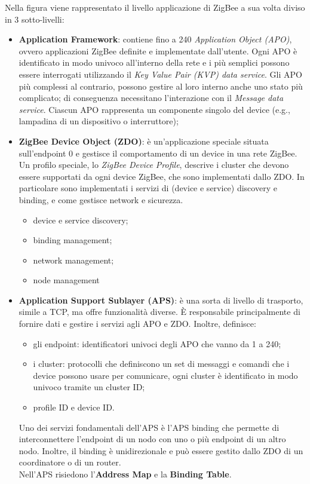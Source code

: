 Nella figura viene rappresentato il livello applicazione di ZigBee a sua volta diviso in 3 sotto-livelli:

\begin{itemize}
\item \textbf{Application Framework}: contiene fino a 240 \emph{Application Object (APO)}, ovvero applicazioni ZigBee definite e implementate dall'utente. Ogni APO è identificato in modo univoco all'interno della rete e i più semplici possono essere interrogati utilizzando il \emph{Key Value Pair (KVP) data service}.
Gli APO più complessi al contrario, possono gestire al loro interno anche uno stato più complicato; di conseguenza necessitano l'interazione con il \emph{Message data service}. Ciascun APO rappresenta un componente singolo del device (e.g., lampadina di un dispositivo o interruttore);
\item \textbf{ZigBee Device Object (ZDO)}: è un'applicazione speciale situata sull'endpoint 0 e gestisce il comportamento di un device in una rete ZigBee. 
Un profilo speciale, lo \textit{ZigBee Device Profile}, descrive i cluster che devono essere supportati da ogni device ZigBee, che sono implementati dallo ZDO.
In particolare sono implementati i servizi di (device e service) discovery e binding, e come gestisce network e sicurezza. 
\begin{itemize}
   \item device e service discovery;
   
   \item binding management;
   
   \item network management;
   
   \item node management
\end{itemize}
\item \textbf{Application Support Sublayer (APS)}: è una sorta di livello di trasporto, simile a TCP, ma offre funzionalità diverse. È responsabile principalmente di fornire dati e gestire i servizi agli APO e ZDO. Inoltre, definisce:
\begin{itemize}
   \item gli endpoint: identificatori univoci degli APO che vanno da 1 a 240;
   
   \item i cluster: protocolli che definiscono un set di messaggi e comandi che i device possono usare per comunicare, ogni cluster è identificato in modo univoco tramite un cluster ID;
   
   \item profile ID e device ID.
\end{itemize}

Uno dei servizi fondamentali dell'APS è l'APS binding che permette di interconnettere l'endpoint di un nodo con uno o più endpoint di un altro nodo. Inoltre, il binding è unidirezionale e può essere gestito dallo ZDO di un coordinatore o di un router. \\
Nell'APS risiedono l'\textbf{Address Map} e la \textbf{Binding Table}.
\end{itemize}

